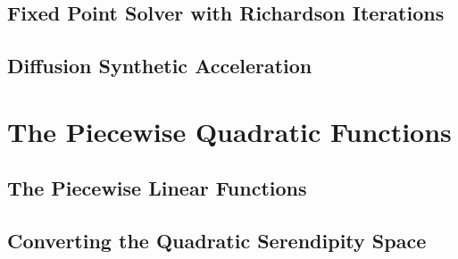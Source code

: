 \documentclass[preprint,review,10pt]{elsarticle}
\begin{document}
\subsection{Fixed Point Solver with Richardson Iterations} \label{sec::Solve_Rich}


\subsection{Diffusion Synthetic Acceleration} \label{sec::Solve_DSA}


\section{The Piecewise Quadratic Functions} \label{sec::PWQ}

\subsection{The Piecewise Linear Functions} \label{sec::PWQ_PWL}

\subsection{Converting the Quadratic Serendipity Space} \label{sec::PWQ_Ser}

\end{document}
